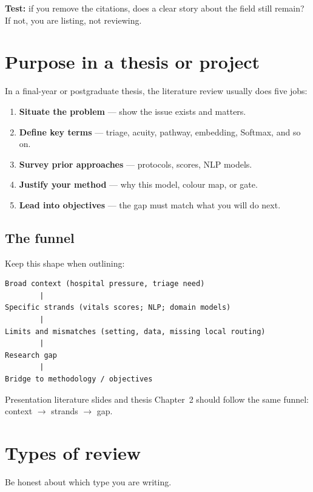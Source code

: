 \documentclass[11pt,a4paper]{article}
\begin{document}
\begin{tipbox}
\textbf{Test:} if you remove the citations, does a clear story about the field still remain? If not, you are listing, not reviewing.
\end{tipbox}

\section{Purpose in a thesis or project}

In a final-year or postgraduate thesis, the literature review usually does five jobs:
\begin{enumerate}
  \item \textbf{Situate the problem} --- show the issue exists and matters.
  \item \textbf{Define key terms} --- triage, acuity, pathway, embedding, Softmax, and so on.
  \item \textbf{Survey prior approaches} --- protocols, scores, NLP models.
  \item \textbf{Justify your method} --- why this model, colour map, or gate.
  \item \textbf{Lead into objectives} --- the gap must match what you will do next.
\end{enumerate}

\subsection{The funnel}
Keep this shape when outlining:
\begin{lstlisting}
Broad context (hospital pressure, triage need)
        |
Specific strands (vitals scores; NLP; domain models)
        |
Limits and mismatches (setting, data, missing local routing)
        |
Research gap
        |
Bridge to methodology / objectives
\end{lstlisting}
Presentation literature slides and thesis Chapter~2 should follow the same funnel: context \(\to\) strands \(\to\) gap.

\section{Types of review}

Be honest about which type you are writing.
\end{document}
